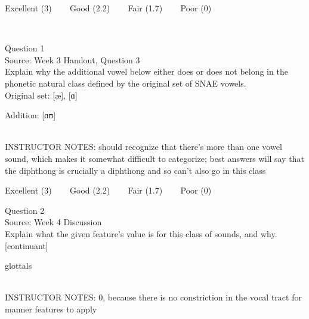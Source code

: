 \documentclass[12pt]{article}
\begin{document}
\vfill
Excellent (3) ~~~ Good (2.2) ~~~ Fair (1.7) ~~~ Poor (0)
\newpage

\begin{center}
\textbf{{\color{red}{\HUGE END OF EXAM}}}\\

\end{center}
\newpage

\begin{center}
\textbf{{\color{blue}{\HUGE START OF EXAM\\}}}

\textbf{{\color{blue}{\HUGE Student ID: 34548\\}}}

\textbf{{\color{blue}{\HUGE 4:10\\}}}

\end{center}
\newpage

{\large Question 1}\\

Source: Week 3 Handout, Question 3\\

Explain why the additional vowel below either does or does not belong in the phonetic natural class defined by the original set of SNAE vowels.\\

Original set: {[æ]}, {[ɑ]}

Addition: {[ɑʊ]}


~\\
INSTRUCTOR NOTES: should recognize that there's more than one vowel sound, which makes it somewhat difficult to categorize; best answers will say that the diphthong is crucially a diphthong and so can't also go in this class


\vfill
Excellent (3) ~~~ Good (2.2) ~~~ Fair (1.7) ~~~ Poor (0)
\newpage

{\large Question 2}\\

Source: Week 4 Discussion\\

Explain what the given feature’s value is for this class of sounds, and why.\\

{[continuant]}

glottals


~\\
INSTRUCTOR NOTES: 0, because there is no constriction in the vocal tract for manner features to apply
\end{document}
